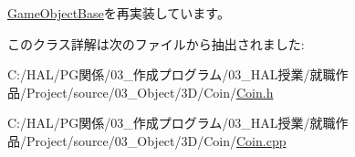 \mbox{\hyperlink{class_game_object_base_a97e1bc277d7b1c0156d4735de29a022c}{Game\+Object\+Base}}を再実装しています。



このクラス詳解は次のファイルから抽出されました\+:\begin{DoxyCompactItemize}
\item 
C\+:/\+H\+A\+L/\+P\+G関係/03\+\_\+作成プログラム/03\+\_\+\+H\+A\+L授業/就職作品/\+Project/source/03\+\_\+\+Object/3\+D/\+Coin/\mbox{\hyperlink{_coin_8h}{Coin.\+h}}\item 
C\+:/\+H\+A\+L/\+P\+G関係/03\+\_\+作成プログラム/03\+\_\+\+H\+A\+L授業/就職作品/\+Project/source/03\+\_\+\+Object/3\+D/\+Coin/\mbox{\hyperlink{_coin_8cpp}{Coin.\+cpp}}\end{DoxyCompactItemize}
